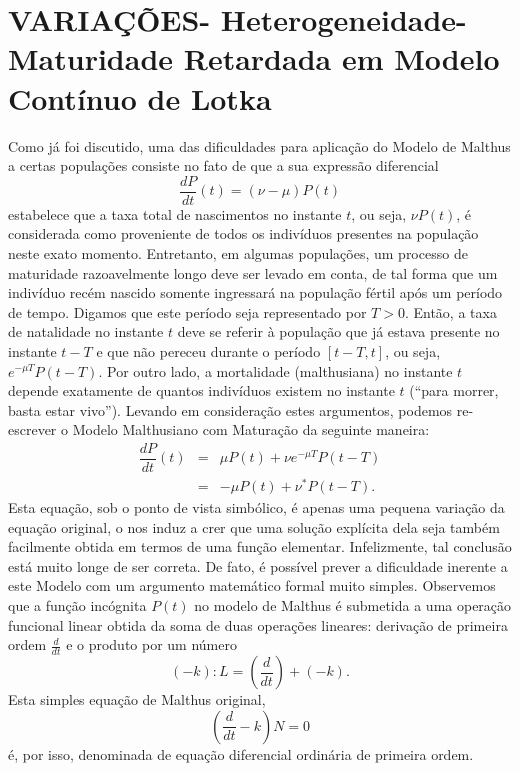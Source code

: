 \section{VARIAÇÕES- Heterogeneidade- Maturidade Retardada em Modelo Contínuo de Lotka}

    Como já foi discutido, uma das dificuldades para aplicação do Modelo de Malthus a certas populações consiste no fato de que a sua expressão diferencial
    \[\dfrac{dP}{dt}(t) = (\nu - \mu) P(t)\]
    estabelece que a taxa total de nascimentos no instante \(t\), ou seja, \(\nu P(t)\), é considerada como proveniente de todos os indivíduos presentes na população neste exato momento. Entretanto, em algumas populações, um processo de maturidade razoavelmente longo deve ser levado em conta, de tal forma que um indivíduo recém nascido somente ingressará na população fértil após um período de tempo. Digamos que este período seja representado por \(T > 0\). Então, a taxa de natalidade no instante \(t\) deve se referir à população que já estava presente no instante \(t-T\) e que não pereceu durante o período \([t-T, t]\), ou seja, \(e^{-\mu T} P(t-T)\). Por outro lado, a mortalidade (malthusiana) no instante \(t\) depende exatamente de quantos indivíduos existem no instante \(t\) (``para morrer, basta estar vivo''). Levando em consideração estes argumentos, podemos re-escrever o Modelo Malthusiano com Maturação da seguinte maneira:
    \begin{eqnarray}
    \dfrac{dP}{dt}(t) &=& \mu P(t) + \nu e^{-\mu T} P(t-T) \nonumber \\ &=& -\mu P(t) + \nu^\ast P(t-T).
    \end{eqnarray}
    Esta equação, sob o ponto de vista simbólico, é apenas uma pequena variação da equação original, o nos induz a crer que uma solução explícita dela seja também facilmente obtida em termos de uma função elementar. Infelizmente, tal conclusão está muito longe de ser correta. De fato, é possível prever a dificuldade inerente a este Modelo com um argumento matemático formal muito simples. Observemos que a função incógnita \(P(t)\) no modelo de Malthus é submetida a uma operação funcional linear obtida da soma de duas operações lineares: derivação de primeira ordem \(\frac{d}{dt}\) e o produto por um número
    \[(-k): L = \left(\frac{d}{dt}\right) + (-k).\]
    Esta simples equação de Malthus original,
    \[\left(\frac{d}{dt}-k\right) N = 0\]
    é, por isso, denominada de equação diferencial ordinária de primeira ordem.

